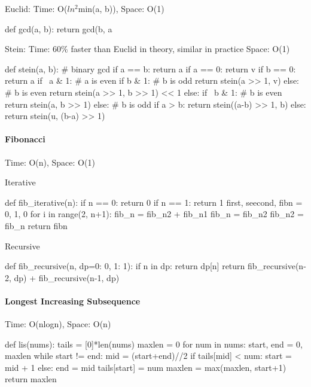 \documentclass[11pt]{article}
\begin{document}
Euclid: Time: O($ln^2$min(a, b)), Space: O(1)
\begin{python}
def gcd(a, b):
    return gcd(b, a %
\end{python}

Stein: Time: 60\% faster than Euclid in theory, similar in practice Space: O(1)
\begin{python}
def stein(a, b):
    # binary gcd
    if a == b: return a
    if a == 0: return v
    if b == 0: return a
    if ~a & 1: # a is even
        if b & 1: # b is odd
            return stein(a >> 1, v)
        else: # b is even
            return stein(a >> 1, b >> 1) << 1
    else:
        if ~b & 1: # b is even
            return stein(a, b >> 1)
        else: # b is odd
            if a > b:
                return stein((a-b) >> 1, b)
            else:
                return stein(u, (b-a) >> 1)
\end{python}


\paragraph{Fibonacci} Time: O(n), Space: O(1)

Iterative
\begin{python}
def fib_iterative(n):
    if n == 0: return 0
    if n == 1: return 1
    first, seecond, fibn = 0, 1, 0
    for i in range(2, n+1):
      fib_n = fib_n2 + fib_n1
      fib_n = fib_n2
      fib_n2 = fib_n
    return fibn
\end{python}

Recursive
\begin{python}
def fib_recursive(n, dp={0: 0, 1: 1}):
    if n in dp:
        return dp[n]
    return fib_recursive(n-2, dp) + fib_recursive(n-1, dp)
\end{python}


\paragraph{Longest Increasing Subsequence} Time: O(nlogn), Space: O(n)

\begin{python}
def lis(nums):
    tails = [0]*len(nums)
    maxlen = 0
    for num in nums:
        start, end = 0, maxlen
        while start != end:
            mid = (start+end)//2
            if tails[mid] < num:
                start = mid + 1
            else:
                end = mid
        tails[start] = num
        maxlen = max(maxlen, start+1)
    return maxlen
\end{python}
\end{document}
